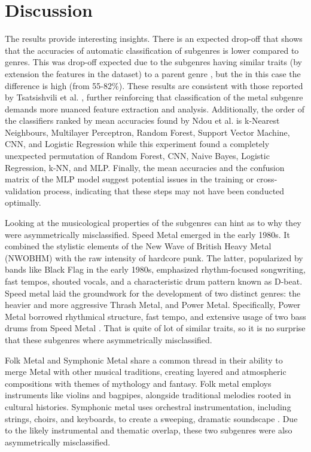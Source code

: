 \section{Discussion}
The results provide interesting insights. There is an expected drop-off that shows that the accuracies of automatic classification of subgenres is lower compared to genres. This was drop-off expected due to the subgenres having similar traits (by extension the features in the dataset) to a parent genre \cite{hider2023polyphony}, but the in this case the difference is high (from 55-82\%). These results are consistent with those reported by Tsatsishvili et al. \cite{tsatsishvili2011automatic}, further reinforcing that classification of the metal subgenre demands more nuanced feature extraction and analysis. Additionally, the order of the classifiers ranked by mean accuracies found by Ndou et al. \cite{ndou2021music} is k-Nearest Neighbours, Multilayer Perceptron, Random Forest, Support Vector Machine, CNN, and Logistic Regression while this experiment found a completely unexpected permutation of Random Forest, CNN, Naive Bayes, Logistic Regression, k-NN, and MLP. Finally, the mean accuracies and the confusion matrix of the MLP model suggest potential issues in the training or cross-validation process, indicating that these steps may not have been conducted optimally.  

Looking at the musicological properties of the subgenres can hint as to why they were asymmetrically misclassified. Speed Metal emerged in the early 1980s. It combined the stylistic elements of the New Wave of British Heavy Metal (NWOBHM) with the raw intensity of hardcore punk. The latter, popularized by bands like Black Flag in the early 1980s, emphasized rhythm-focused songwriting, fast tempos, shouted vocals, and a characteristic drum pattern known as D-beat. Speed metal laid the groundwork for the development of two distinct genres: the heavier and more aggressive Thrash Metal, and Power Metal. Specifically, Power Metal borrowed rhythmical structure, fast tempo, and extensive usage of two bass drums from Speed Metal \cite{tsatsishvili2011automatic}. That is quite of lot of similar traits, so it is no surprise that these subgenres where asymmetrically misclassified. 

Folk Metal and Symphonic Metal share a common thread in their ability to merge Metal with other musical traditions, creating layered and atmospheric compositions with themes of mythology and fantasy. Folk metal employs instruments like violins and bagpipes, alongside traditional melodies rooted in cultural histories. Symphonic metal uses orchestral instrumentation, including strings, choirs, and keyboards, to create a sweeping, dramatic soundscape \cite{marjenin2014metal}. Due to the likely instrumental and thematic overlap, these two subgenres were also asymmetrically misclassified.   
